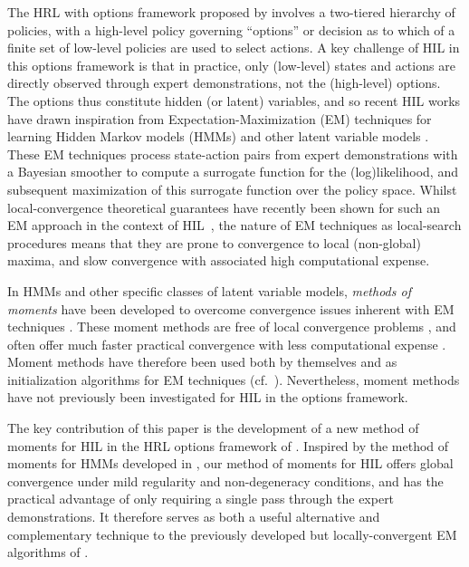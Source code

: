 The HRL with options framework proposed by \cite{SUTTON1999181} involves a two-tiered hierarchy of policies, with a high-level policy governing ``options'' or decision as to which of a finite set of low-level policies are used to select actions.
A key challenge of HIL in this options framework is that in practice, only (low-level) states and actions are directly observed through expert demonstrations, not the (high-level) options.
The options thus constitute hidden (or latent) variables, and so recent HIL works have drawn inspiration from Expectation-Maximization (EM) techniques for learning Hidden Markov models (HMMs) and other latent variable models \citep{Daniel2016,zhiyu20,Giammarino_2021}.
These EM techniques process state-action pairs from expert demonstrations with a Bayesian smoother to compute a surrogate function for the (log)likelihood, and subsequent maximization of this surrogate function over the policy space.
Whilst local-convergence theoretical guarantees have recently been shown for such an EM approach in the context of HIL~\citep{zhiyu20}, the nature of EM techniques as local-search procedures means that they are prone to convergence to local (non-global) maxima, and slow convergence with associated high computational expense.

In HMMs and other specific classes of latent variable models, \emph{methods of moments} have been developed to overcome convergence issues inherent with EM techniques \citep{hsu08,HsuKakade13,Mattila2020,Mattila2015,Mattila2017,Anandkumar2014,Parikh2012}.
These moment methods are free of local convergence problems \citep{Mattila2020,Anandkumar2014}, and often offer much faster practical convergence with less computational expense \citep{Mattila2015,Mattila2017}.
Moment methods have therefore been used both by themselves and as initialization algorithms for EM techniques (cf.~\citep{Zhang2016}).
Nevertheless, moment methods have not previously been investigated for HIL in the options framework.

The key contribution of this paper is the development of a new method of moments for HIL in the HRL options framework of \citep{SUTTON1999181}. Inspired by the method of moments for HMMs developed in \citep{hsu08}, our method of moments for HIL offers global convergence under mild regularity and non-degeneracy conditions, and has the practical advantage of only requiring a single pass through the expert demonstrations.
It therefore serves as both a useful alternative and complementary technique to the previously developed but locally-convergent EM algorithms of \citep{Daniel2016,Giammarino_2021, zhiyu20}.

